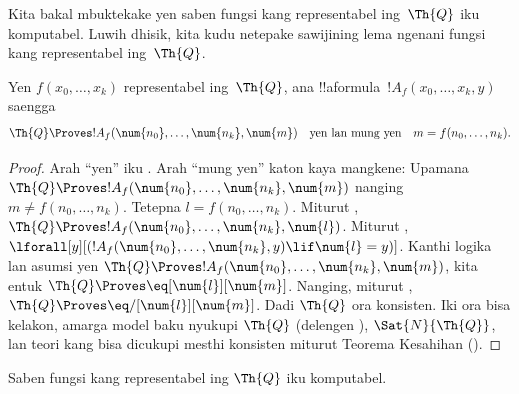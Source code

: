 \documentclass[../../../include/open-logic-section]{subfiles}
\begin{document}

Kita bakal mbuktekake yen saben fungsi kang representabel ing~$\Th{Q}$
iku komputabel. Luwih dhisik, kita kudu netepake sawijining lema
ngenani fungsi kang representabel ing~$\Th{Q}$.

\begin{lem}
  Yen $f(x_0,
  \dots, x_k)$ representabel ing~$\Th{Q}$, ana
  !!a{formula}~$!A_f(x_0, \dots, x_k, y)$ saengga
  \[
  \Th{Q} \Proves !A_f(\num{n_0}, \dots, \num{n_k}, \num{m})
  \quad\text{yen lan mung yen}\quad m = f(n_0, \dots, n_k).
  \]
\end{lem}

\begin{proof}
  Arah ``yen'' iku
. Arah ``mung
yen'' katon kaya mangkene: Upamana $\Th{Q} \Proves !A_f(\num{n_0},
\dots, \num{n_k}, \num{m})$ nanging $m \neq f(n_0, \dots, n_k)$. Tetepna $l =
f(n_0, \dots, n_k)$. Miturut
, $\Th{Q}
\Proves !A_f(\num{n_0}, \dots, \num{n_k}, \num{l})$. Miturut
,
$\lforall[y][(!A_f(\num{n_0}, \dots, \num{n_k}, y) \lif \num{l} =
y)]$. Kanthi logika lan asumsi yen $\Th{Q} \Proves
!A_f(\num{n_0}, \dots, \num{n_k}, \num{m})$, kita entuk $\Th{Q}
\Proves \eq[\num{l}][\num{m}]$. Nanging, miturut
, $\Th{Q} \Proves
\eq/[\num{l}][\num{m}]$. Dadi $\Th{Q}$ ora konsisten. Iki
ora bisa kelakon, amarga model baku nyukupi $\Th{Q}$ (delengen
), $\Sat{N}{\Th{Q}}$, lan
teori kang bisa dicukupi mesthi konsisten miturut Teorema Kesahihan
().
\end{proof}

\begin{lem}
Saben fungsi kang representabel ing $\Th{Q}$ iku komputabel.
\end{lem}
\end{document}
